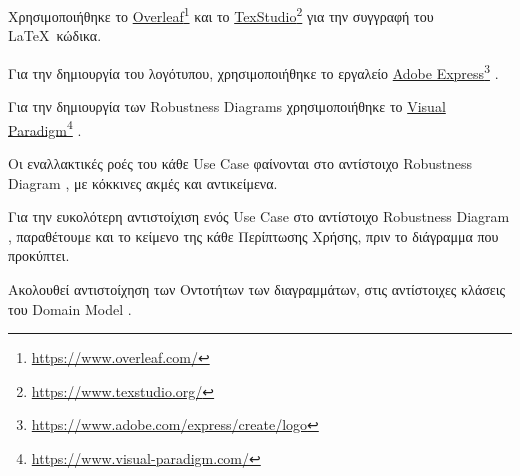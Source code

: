 \documentclass{../ol-softwaremanual}
\newcommand{\doclink}[2]{\href{#1}{#2}\footnote{\url{#1}}}
\begin{document}
	
	\newpage
	
	
	\vspace{20pt}
	\flushleft
	Χρησιμοποιήθηκε το \en \doclink{https://www.overleaf.com/}{Overleaf} \gr και το \en \doclink{https://www.texstudio.org/}{TexStudio} \gr για την συγγραφή του \LaTeX\ κώδικα. \break
	
	Για την δημιουργία του λογότυπου, χρησιμοποιήθηκε το εργαλείο \en \doclink{https://www.adobe.com/express/create/logo}{Adobe Express} . \gr \break
	
	Για την δημιουργία των \en Robustness Diagrams \gr χρησιμοποιήθηκε το \en \doclink{https://www.visual-paradigm.com/}{Visual Paradigm} . \gr \break 
	
	\newpage
	
	\flushleft
	
	Οι εναλλακτικές ροές του κάθε \en Use Case \gr φαίνονται στο αντίστοιχο \en Robustness Diagram \gr, με κόκκινες ακμές και αντικείμενα. \break
	
	Για την ευκολότερη αντιστοίχιση ενός \en Use Case \gr στο αντίστοιχο \en Robustness Diagram \gr, παραθέτουμε και το κείμενο της κάθε Περίπτωσης Χρήσης, πριν το διάγραμμα που προκύπτει. \break
	
	Ακολουθεί αντιστοίχηση των Οντοτήτων των διαγραμμάτων, στις αντίστοιχες κλάσεις του \en Domain Model \gr.
	
\end{document}
